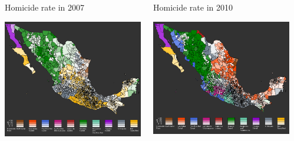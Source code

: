 \documentclass[final]{beamer}
\newlength{\onecolwid}
\newlength{\threecolwid}
\begin{document}
\begin{frame}[t]
\begin{columns}[t]
\begin{column}{\threecolwid}
\begin{columns}[t,totalwidth=\threecolwid]
\begin{column}{\onecolwid}
        \end{column}
\begin{column}{\onecolwid}
\begin{block}{Homicide rate in 2007}
            \vspace{0.75in}
            \begin{center}
              \includegraphics[width=7.2in]{2007.png}
            \end{center}
          \end{block}        
        \end{column}
        \begin{column}{\onecolwid}
          \begin{block}{Homicide rate in 2010}
            \vspace{0.75in}
            \begin{center}
              \includegraphics[width=7.2in]{2010.png}

\end{center}
\end{block}
\end{column}
\end{columns}
\end{column}
\end{columns}
\end{frame}
\end{document}
